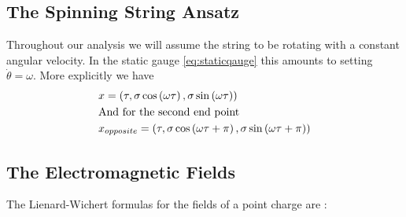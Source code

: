 \documentclass[11pt,a4paper]{article}
\begin{document}
\FloatBarrier
\subsection{The Spinning String Ansatz}
Throughout our analysis we will assume the string to be rotating with a constant angular velocity. In the static gauge \ref{eq:staticqauge} this amounts to setting $\dot{\theta}=\omega$. More explicitly we have
\begin{subequations}
\label{eq:SpinningStringAnsatz}
\begin{align}
&x=\left(\tau,\sigma\cos\left(\omega\tau\right),\sigma\sin\left(\omega\tau\right)\right) \\
&\text{And for the second end point}\notag\\
&x_{opposite}=\left(\tau,\sigma\cos\left(\omega\tau+\pi\right),\sigma\sin\left(\omega\tau+\pi\right)\right)
\end{align}
\end{subequations}

\FloatBarrier
\subsection{The Electromagnetic Fields}

The Lienard-Wichert formulas for the fields of a point charge are \cite{Jackson}:
\end{document}
